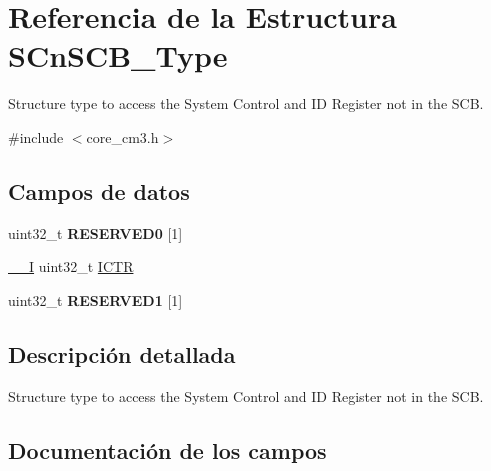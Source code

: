 \hypertarget{struct_s_cn_s_c_b___type}{}\section{Referencia de la Estructura S\+Cn\+S\+C\+B\+\_\+\+Type}
\label{struct_s_cn_s_c_b___type}


Structure type to access the System Control and ID Register not in the S\+CB.  




{\ttfamily \#include $<$core\+\_\+cm3.\+h$>$}

\subsection*{Campos de datos}
\begin{DoxyCompactItemize}
\item 
\mbox{\label{struct_s_cn_s_c_b___type_a40626516c1871e2cb75ae9d5940a9341}} 
uint32\+\_\+t {\bfseries R\+E\+S\+E\+R\+V\+E\+D0} \mbox{[}1\mbox{]}
\item 
\mbox{\hyperlink{core__cm3_8h_af63697ed9952cc71e1225efe205f6cd3}{\+\_\+\+\_\+I}} uint32\+\_\+t \mbox{\hyperlink{struct_s_cn_s_c_b___type_a5bb2c6795b90f12077534825cc844b56}{I\+C\+TR}}
\item 
\mbox{\label{struct_s_cn_s_c_b___type_a3e94488b04b41e4c165bbfe6932f4a92}} 
uint32\+\_\+t {\bfseries R\+E\+S\+E\+R\+V\+E\+D1} \mbox{[}1\mbox{]}
\end{DoxyCompactItemize}


\subsection{Descripción detallada}
Structure type to access the System Control and ID Register not in the S\+CB. 

\subsection{Documentación de los campos}
\mbox{\label{struct_s_cn_s_c_b___type_a5bb2c6795b90f12077534825cc844b56}} 
